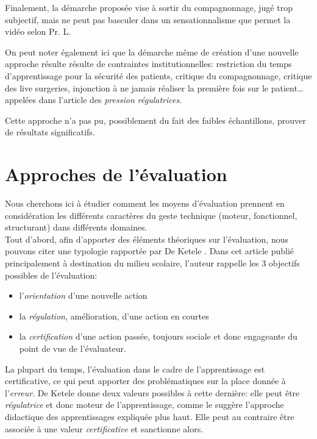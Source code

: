\documentclass{article}
\begin{document}
Finalement, la démarche proposée vise à sortir du compagnonnage, jugé
trop subjectif, mais ne peut pas basculer dans un sensationnalisme que
permet la vidéo selon Pr. L.

On peut noter également ici que la démarche même de création d'une nouvelle
approche résulte résulte de contraintes institutionnelles: restriction
du temps d'apprentissage pour la sécurité des patients, critique du
compagnonnage, critique des live surgeries, injonction à ne jamais réaliser
la première fois sur le patient\dots appelées dans l'article des 
\emph{pression régulatrices}.

Cette approche n'a pas pu, possiblement du fait des faibles échantillons,
prouver de résultats significatifs.


\section{Approches de l'évaluation}

Nous cherchons ici à étudier comment les moyens d'évaluation prennent en 
considération les différents caractères du geste technique (moteur, 
fonctionnel, structurant) dans différents domaines.
\\

Tout d'abord, afin d'apporter des éléments théoriques sur l'évaluation, 
nous pouvons citer une typologie rapportée par De Ketele 
\cite{de_ketele_ne_2010}. Dans cet article publié principalement à 
destination du milieu scolaire, l'auteur rappelle les 3 objectifs 
possibles de l'évaluation:
\begin{itemize}
    \item l'\emph{orientation} d'une nouvelle action
    \item la \emph{régulation}, amélioration, d'une action en courtes
    \item la \emph{certification} d'une action passée, toujours sociale 
    et donc engageante du point de vue de l'évaluateur.
\end{itemize}
La plupart du temps, l'évaluation dans le cadre de l'apprentissage est 
certificative, ce qui peut apporter des problématiques sur la place 
donnée à l'\emph{erreur}. De Ketele donne deux valeurs possibles à cette 
dernière: elle peut être \emph{régulatrice} et donc moteur de 
l'apprentissage, comme le suggère l'approche didactique des apprentissages 
expliquée plus haut.
Elle peut au contraire être associée à une valeur \emph{certificative} et 
sanctionne alors.
\end{document}

